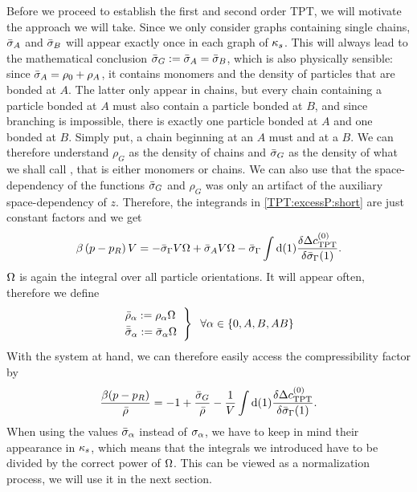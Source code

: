 \documentclass[8.5pt,twoside,twocolumn]{article}
\newcommand\di{\te{d}}
\newcommand\inon{\enmat{\int\di(1)}}
\newcommand\roz{\enmat{\rho_0}}
\theoremstyle{standard}
\begin{document}
Before we proceed to establish the first and second order TPT, we will
motivate the approach we will take. Since we only consider graphs containing
single chains, $\sia$ and $\sib$ will appear exactly once in each graph of $\kappa_s$.
This will always lead to the mathematical conclusion $\sig:=\sia=\sib$, which is
also physically sensible: since $\si_A=\roz+\rho_A$, it contains monomers and the density
of particles that are bonded at $A$. The latter only appear in chains, but every chain
containing a particle bonded at $A$ must also contain a particle bonded at $B$, and since
branching is impossible, there is exactly one particle bonded at $A$ and one bonded at $B$.
Simply put, a chain beginning at an $A$ must and at a $B$. We can therefore
understand $\rho_G$ as the density of chains and $\sig$ as the density of 
what we shall call , that is either monomers or chains. We can also use that
the space-dependency of the functions $\sig$ and $\rho_G$ was only an artifact
of the auxiliary space-dependency of $z$. Therefore, the integrands in \eqref{TPT:excessP:short}
are just constant factors and we get
\begin{equation}
\begin{aligned}
\be \rb{p-p_R}V = -\siga V \Om+\si_A V \Om- \siga \inon\delti{\dct}{\siga(1)}.
\end{aligned}
\label{TPT:excessP:noint}
\end{equation}
$\Omega$ is again the integral over all particle orientations. It will appear often, therefore
we define
\begin{equation}
\begin{rcases}
\bar \rho_\al := \rho_\al \Om\hskip .2cm \\
\bar \si_\al := \si_\al \Om\hskip .2cm 
\end{rcases}
\hskip .2cm \forall \al \in \st{0,A,B,AB}
\end{equation}
With the system at hand, we can therefore easily access the compressibility factor
by
\renewcommand\si{\bar\sigma}
\newcommand\siab{\si_{AB}}
 \newcommand\roa{\bar\rho_{A}}
 \renewcommand\roz{\bar\rho_{0}}
 \newcommand\rog{\bar\rho_{G}}
 \newcommand\rob{\bar\rho_{B}}
 \newcommand\roab{\bar\rho_{AB}}
\begin{equation}
\frac{\be(p-p_R)}{\tr}=-1+\frac{\sig}{\tr}-\frac 1 {V} \inon\delti{\dct}{\siga(1)}.
\label{TPT:excessP:nearlyNu}
\end{equation}
When using the values $\si_\al$ instead of $\sigma_{\alpha}$, we have to keep in mind their appearance in
$\kappa_s$, which means that the integrals we introduced have to be divided by the correct power
of $\Omega$. This can be viewed as a normalization process, we will use it in the next section.
\end{document}
